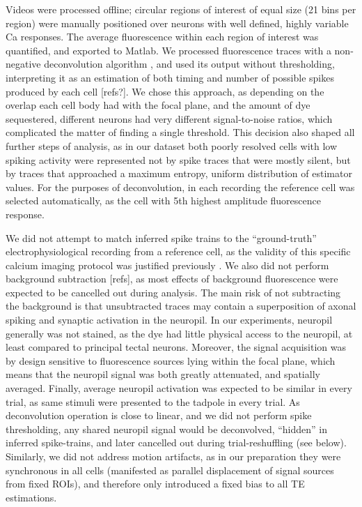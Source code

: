 \documentclass{article}
\begin{document}
Videos were processed offline; circular regions of interest of equal size (21 bins per region) were manually positioned over neurons with well defined, highly variable Ca responses. The average fluorescence within each region of interest was quantified, and exported to Matlab. We processed fluorescence traces with a non-negative deconvolution algorithm \citep{vogelstein2010oopsi}, and used its output without thresholding, interpreting it as an estimation of both timing and number of possible spikes produced by each cell [refs?]. We chose this approach, as depending on the overlap each cell body had with the focal plane, and the amount of dye sequestered, different neurons had very different signal-to-noise ratios, which complicated the matter of finding a single threshold. This decision also shaped all further steps of analysis, as in our dataset both poorly resolved cells with low spiking activity were represented not by spike traces that were mostly silent, but by traces that approached a maximum entropy, uniform distribution of estimator values. For the purposes of deconvolution, in each recording the reference cell was selected automatically, as the cell with 5th highest amplitude fluorescence response.

We did not attempt to match inferred spike trains to the “ground-truth” electrophysiological recording from a reference cell, as the validity of this specific calcium imaging protocol was justified previously \citep{xu2011,truszkowski2017}. We also did not perform background subtraction [refs], as most effects of background fluorescence were expected to be cancelled out during analysis. The main risk of not subtracting the background is that unsubtracted traces may contain a superposition of axonal spiking and synaptic activation in the neuropil. In our experiments, neuropil generally was not stained, as the dye had little physical access to the neuropil, at least compared to principal tectal neurons. Moreover, the signal acquisition was by design sensitive to fluorescence sources lying within the focal plane, which means that the neuropil signal was both greatly attenuated, and spatially averaged. Finally, average neuropil activation was expected to be similar in every trial, as same stimuli were presented to the tadpole in every trial. As deconvolution operation is close to linear, and we did not perform spike thresholding, any shared neuropil signal would be deconvolved, “hidden” in inferred spike-trains, and later cancelled out during trial-reshuffling (see below). Similarly, we did not address motion artifacts, as in our preparation they were synchronous in all cells (manifested as parallel displacement of signal sources from fixed ROIs), and therefore only introduced a fixed bias to all TE estimations.
\end{document}
